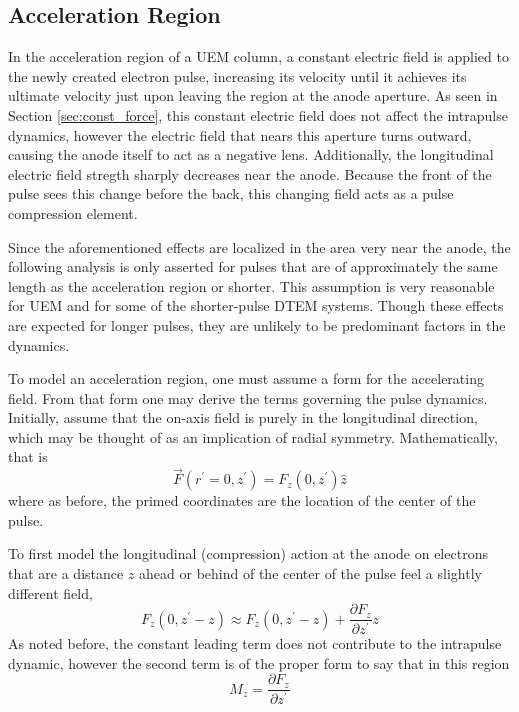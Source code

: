 \subsection{Acceleration Region} \label{sec:gun_model}

In the acceleration region of a UEM column, a constant electric field is applied to the newly created electron pulse, increasing its velocity until it achieves its ultimate velocity just upon leaving the region at the anode aperture.
As seen in Section \ref{sec:const_force}, this constant electric field does not affect the intrapulse dynamics, however the electric field that nears this aperture turns outward, causing the anode itself to act as a negative lens. %
Additionally, the longitudinal electric field stregth sharply decreases near the anode.
Because the front of the pulse sees this change before the back, this changing field acts as a pulse compression element.

Since the aforementioned effects are localized in the area very near the anode, the following analysis is only asserted for pulses that are of approximately the same length as the acceleration region or shorter.
This assumption is very reasonable for UEM and for some of the shorter-pulse DTEM systems.
Though these effects are expected for longer pulses, they are unlikely to be predominant factors in the dynamics.

To model an acceleration region, one must assume a form for the accelerating field.
From that form one may derive the terms governing the pulse dynamics. Initially, assume that the on-axis field is purely in the longitudinal direction, which may be thought of as an implication of radial symmetry.
Mathematically, that is
\begin{equation}
  \vec{F}(r^{\prime}=0,z^{\prime}) = F_z (0,z^{\prime}) \hat{z}
\end{equation}
where as before, the primed coordinates are the location of the center of the pulse.

To first model the longitudinal (compression) action at the anode %
on electrons that are a distance $z$ ahead or behind of the center of the pulse feel a slightly different field, 
\begin{equation}
  F_z(0,z^{\prime} - z) \approx F_z(0,z^{\prime} - z) + \frac{\partial F_z}{\partial z^{\prime}} z
\end{equation}
As noted before, the constant leading term does not contribute to the intrapulse dynamic, however the second term is of the proper form to say that in this region
\begin{equation}
  M_z = \frac{\partial F_z}{\partial z^{\prime}}
\end{equation}


